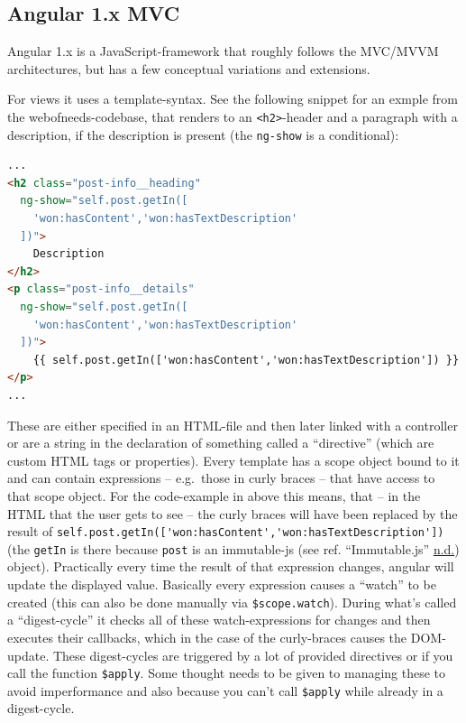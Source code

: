 \documentclass[a4paper,,tablecaptionabove]{scrbook}
\newcommand{\passthrough}[1]{#1}
\begin{document}
\hypertarget{sec:angular-mvc}{%
\subsection{Angular 1.x MVC}\label{sec:angular-mvc}}

Angular 1.x is a JavaScript-framework that roughly follows the MVC/MVVM
architectures, but has a few conceptual variations and extensions.

For views it uses a template-syntax. See the following snippet for an
exmple from the webofneeds-codebase, that renders to an
\passthrough{\lstinline!<h2>!}-header and a paragraph with a
description, if the description is present (the
\passthrough{\lstinline!ng-show!} is a conditional):

\begin{lstlisting}[language=HTML, caption={Example angular template code from WoN-codebase}, label=fig:ng-template]
...
<h2 class="post-info__heading"
  ng-show="self.post.getIn([
    'won:hasContent','won:hasTextDescription'
  ])">
    Description
</h2>
<p class="post-info__details"
  ng-show="self.post.getIn([
    'won:hasContent','won:hasTextDescription'
  ])">
    {{ self.post.getIn(['won:hasContent','won:hasTextDescription']) }}
</p>
...
\end{lstlisting}

These are either specified in an HTML-file and then later linked with a
controller or are a string in the declaration of something called a
\enquote{directive} (which are custom HTML tags or properties). Every
template has a scope object bound to it and can contain expressions --
e.g.~those in curly braces -- that have access to that scope object. For
the code-example in above this means, that -- in the HTML that the user
gets to see -- the curly braces will have been replaced by the result of
\passthrough{\lstinline!self.post.getIn(['won:hasContent','won:hasTextDescription'])!}
(the \passthrough{\lstinline!getIn!} is there because
\passthrough{\lstinline!post!} is an immutable-js (see ref.
``Immutable.js'' \protect\hyperlink{ref-Immutablejs}{n.d.}) object).
Practically every time the result of that expression changes, angular
will update the displayed value. Basically every expression causes a
\enquote{watch} to be created (this can also be done manually via
\passthrough{\lstinline!$scope.watch!}). During what's called a
\enquote{digest-cycle} it checks all of these watch-expressions for
changes and then executes their callbacks, which in the case of the
curly-braces causes the DOM-update. These digest-cycles are triggered by
a lot of provided directives or if you call the function
\passthrough{\lstinline!$apply!}. Some thought needs to be given to
managing these to avoid imperformance and also because you can't call
\passthrough{\lstinline!$apply!} while already in a digest-cycle.
\end{document}
